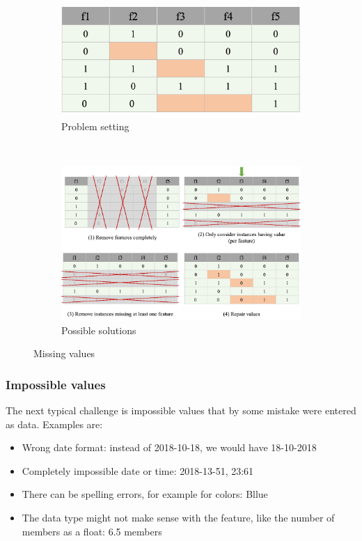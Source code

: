 \begin{figure}[h]
  \centering
  \begin{subfigure}{0.4\textwidth}
    \includegraphics[width=\linewidth]{assets/visualization_and_extraction/problem_missing_values.png}
    \caption{Problem setting}
  \end{subfigure}\\
  \vspace*{0.5cm}
  \begin{subfigure}{0.7\textwidth}
    \includegraphics[width=\linewidth]{assets/visualization_and_extraction/solution_missing_values.png}
    \caption{Possible solutions}
  \end{subfigure}
  \caption{Missing values}
  \label{fig:2_missing_values}
\end{figure}

\subsubsection*{Impossible values}
The next typical challenge is impossible values that by some mistake were entered as data. Examples are:
\begin{itemize}
  \item Wrong date format: instead of \textcolor{mathblue}{2018-10-18}, we would have \textcolor{mathblue}{18-10-2018}
  \item Completely impossible date or time: \textcolor{mathblue}{2018-13-51}, \textcolor{mathblue}{23:61}
  \item There can be spelling errors, for example for colors: \textcolor{mathblue}{Bllue}
  \item The data type might not make sense with the feature, like the number of members as a float: \textcolor{mathblue}{6.5 members}
\end{itemize}

